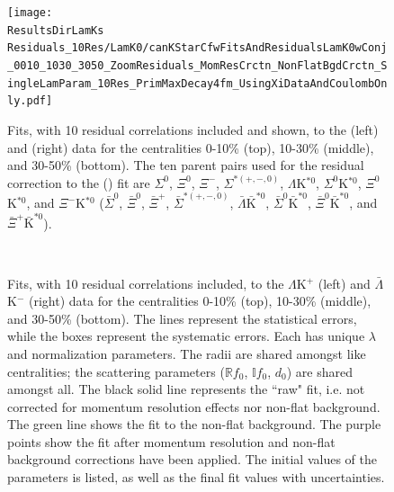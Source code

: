 \documentclass[../AnalysisNoteJBuxton.tex]{subfiles}
\begin{document}
\begin{figure}[h]
  \centering
  \texttt{[image: \\ResultsDirLamKs Residuals\_10Res/LamK0/canKStarCfwFitsAndResidualsLamK0wConj\_0010\_1030\_3050\_ZoomResiduals\_MomResCrctn\_NonFlatBgdCrctn\_SingleLamParam\_10Res\_PrimMaxDecay4fm\_UsingXiDataAndCoulombOnly.pdf]}
  \caption[\LamALamKs Fits showing 10 Residuals]{Fits, with 10 residual correlations included and shown, to the \LamKs (left) and \ALamKs (right) data for the centralities 0-10\% (top), 10-30\% (middle), and 30-50\% (bottom).  The ten parent pairs used for the residual correction to the \LamKs (\ALamKs) fit are $\Sigma^{0}$\Ks, $\Xi^{0}$\Ks, $\Xi^{-}$\Ks, $\Sigma^{*(+,-,0)}$\Ks, $\Lambda$K$^{*0}$, $\Sigma^{0}$K$^{*0}$, $\Xi^{0}$K$^{*0}$, and $\Xi^{-}$K$^{*0}$ ($\bar{\Sigma}^{0}$\Ks, $\bar{\Xi}^{0}$\Ks, $\bar{\Xi}^{+}$\Ks, $\bar{\Sigma}^{*(+,-,0)}$\Ks, $\bar{\Lambda}\bar{\mathrm{K}}^{*0}$, $\bar{\Sigma}^{0}\bar{\mathrm{K}}^{*0}$, $\bar{\Xi}^{0}\bar{\mathrm{K}}^{*0}$, and $\bar{\Xi}^{+}\bar{\mathrm{K}}^{*0}$).}
  \label{fig:LamK0wConjFitsAndResiduals_10Res}
\end{figure}







\begin{figure}[h!]
  \centering
  \\  
  \caption[$\Lambda$K$^{+}$($\bar{\Lambda}$K$^{-}$) Fits with 10 Residuals]{Fits, with 10 residual correlations included, to the $\Lambda$K$^{+}$ (left) and $\bar{\Lambda}$K$^{-}$ (right) data for the centralities 0-10\% (top), 10-30\% (middle), and 30-50\% (bottom).
The lines represent the statistical errors, while the boxes represent the systematic errors.  
Each has unique $\lambda$ and normalization parameters.
The radii are shared amongst like centralities; the scattering parameters ($\mathbb{R}f_{0}$, $\mathbb{I}f_{0}$, $d_{0}$) are shared amongst all.
The black solid line represents the ``raw" fit, i.e. not corrected for momentum resolution effects nor non-flat background.  
The green line shows the fit to the non-flat background.
The purple points show the fit after momentum resolution and non-flat background corrections have been applied.
The initial values of the parameters is listed, as well as the final fit values with uncertainties.}
  \label{fig:LamKchPwConjFits_10Res}
\end{figure}
\end{document}
